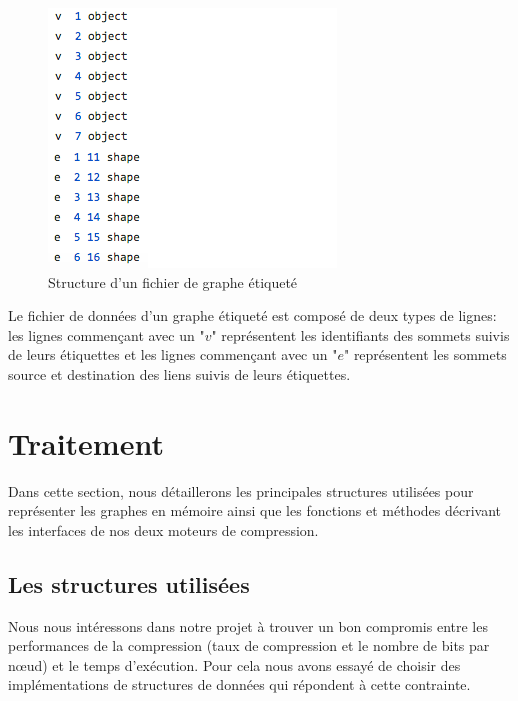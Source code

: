 \begin{itemize}[label=$\bullet$]
\begin{figure}[H]
	\label{Img:etiqGr}
	\includegraphics[scale=0.6]{ressources/image/etiquegr.png}
	\caption{Structure d'un fichier de graphe étiqueté}
 \end{figure}

Le fichier de données d'un graphe étiqueté est composé de deux types de lignes: les lignes commençant avec un "$v$" représentent les identifiants des sommets suivis de leurs étiquettes et les lignes commençant avec un "$e$" représentent les sommets source et destination des liens suivis de leurs étiquettes.
	
	\end{itemize}
	
	
	
	\section{Traitement}

Dans cette section, nous détaillerons les principales structures utilisées pour représenter les graphes en mémoire ainsi que les fonctions et méthodes décrivant les interfaces de nos deux moteurs  de compression. 
\subsection{Les structures utilisées }
Nous nous intéressons dans notre projet à trouver un bon compromis entre les performances de la compression (taux de compression et le nombre de bits par nœud) et le temps d'exécution. Pour cela nous avons essayé de choisir des implémentations de structures de données qui répondent à cette contrainte.

